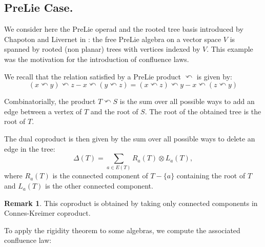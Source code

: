 \documentclass[11pt,leqno]{amsart}
\theoremstyle{definition}
\newtheorem{remark}[definition]{Remark}
\theoremstyle{plain}
\begin{document}
\subsection{PreLie Case.} \label{PLcase}


We consider here the PreLie operad and the rooted tree basis introduced by Chapoton and Livernet in \cite{ChapLiv}: the free PreLie algebra on a vector space $V$ is spanned by rooted (non planar) trees with vertices indexed by $V$.  This example was the motivation for the introduction of confluence laws.


We recall that the relation satisfied by a PreLie product $\curvearrowleft$ is given by: 
\begin{equation*}
(x \curvearrowleft y) \curvearrowleft z - x \curvearrowleft (y \curvearrowleft z)=
(x \curvearrowleft z) \curvearrowleft y - x \curvearrowleft (z \curvearrowleft y)
\end{equation*}

Combinatorially, the product $T \curvearrowleft S$ is the sum over all possible ways to add an edge between a vertex of $T$ and the root of $S$. The root of the obtained tree is the root of $T$.
 
The dual coproduct is then given by the sum over all possible ways to delete an edge in the tree:
\begin{equation*}
\Delta(T)=\sum_{a \in E(T)} R_a(T)  \otimes L_a(T),
\end{equation*}
where $R_a(T)$ is the connected component of $T-\{a\}$ containing the root of $T$ and $L_a(T)$ is the other connected component.

\begin{remark}
This coproduct is obtained by taking only connected components in Connes-Kreimer coproduct.
\end{remark}

To apply the rigidity theorem to some algebras, we compute the associated confluence law:
\end{document}
